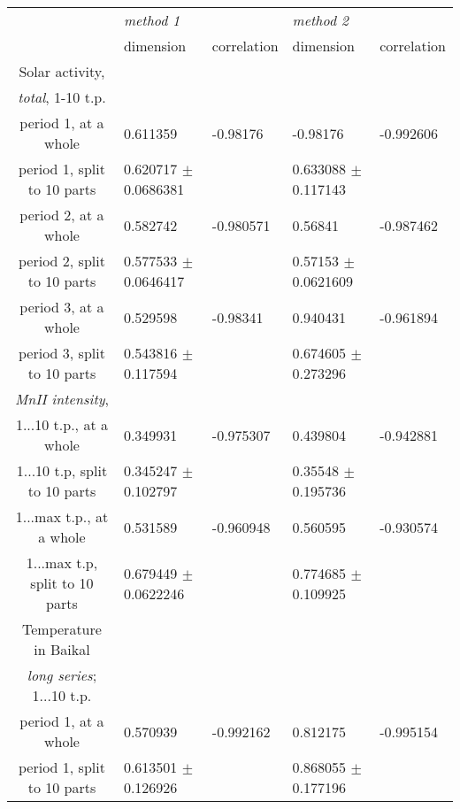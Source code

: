 \documentclass[a4paper]{article}
\begin{document}
\small{

\begin{tabular}{cllll}
\hline
                               & \textit{method 1}        &             & \textit{method 2}        &             \\
                               & dimension                & correlation & dimension                & correlation \\
\hline 
Solar activity,\\
\textit{total}, 1-10 t.p.\\
period 1, at a whole           & 0.611359                 & -0.98176    & -0.98176                 & -0.992606   \\
period 1, split to 10 parts    & 0.620717 $\pm$ 0.0686381 &             & 0.633088 $\pm$ 0.117143  &             \\
period 2, at a whole           & 0.582742                 & -0.980571   & 0.56841                  & -0.987462   \\
period 2, split to 10 parts    & 0.577533 $\pm$ 0.0646417 &             & 0.57153  $\pm$ 0.0621609 &             \\
period 3, at a whole           & 0.529598                 & -0.98341    & 0.940431                 & -0.961894   \\
period 3, split to 10 parts    & 0.543816 $\pm$ 0.117594  &             & 0.674605 $\pm$ 0.273296  &             \\
\textit{MnII intensity},\\
1...10 t.p., at a whole        & 0.349931                 & -0.975307   & 0.439804                 & -0.942881   \\
1...10 t.p, split to 10 parts  & 0.345247 $\pm$ 0.102797  &             & 0.35548 $\pm$ 0.195736   &             \\
1...max t.p., at a whole       & 0.531589                 & -0.960948   & 0.560595                 & -0.930574   \\
1...max t.p, split to 10 parts & 0.679449 $\pm$ 0.0622246 &             & 0.774685 $\pm$ 0.109925  &             \\
\hline
Temperature in Baikal\\
\textit{long series}; 1...10 t.p.\\
period 1, at a whole           & 0.570939                 & -0.992162   & 0.812175                 & -0.995154   \\
period 1, split to 10 parts    & 0.613501 $\pm$ 0.126926  &             & 0.868055 $\pm$ 0.177196  &             \\

\end{tabular}}
\end{document}
